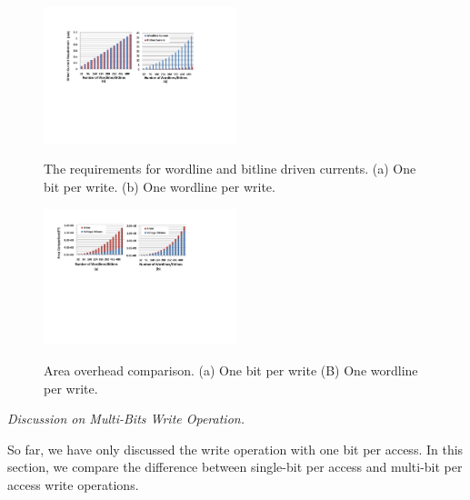 \begin{figure}%
\centering
  \includegraphics[width=0.5\textwidth]{./figures/drive_i_f.pdf}\\
  \caption{The requirements for wordline and bitline driven currents. (a) One bit per write. (b) One wordline per write.}\label{fig:drive_i}
\end{figure}



\begin{figure}%
\centering
  \includegraphics[width=0.5\textwidth]{./figures/area_comp_f.pdf}\\
  \caption{Area overhead comparison. (a) One bit per write (B) One wordline per write.}\label{fig:area_i}
\vspace{-10pt}
\end{figure}

\vspace{6pt} \emph{Discussion on Multi-Bits Write Operation.} \vspace{2pt}

So far, we have only discussed the write operation with one bit per
access. In this section, we compare the difference between single-bit per
access and multi-bit per access write operations.

